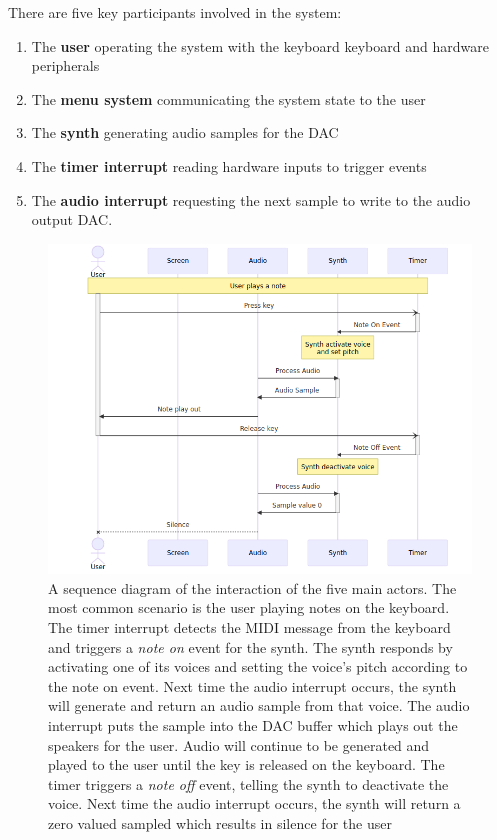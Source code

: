 \documentclass[acmlarge,screen]{acmart}
\begin{document}
	There are five key participants involved in the system:
	\begin{enumerate}
		\item The \textbf{user} operating the system with the keyboard keyboard and hardware peripherals
		\item The \textbf{menu system} communicating the system state to the user
		\item The \textbf{synth} generating audio samples for the DAC
		\item The \textbf{timer interrupt} reading hardware inputs to trigger events
		\item The \textbf{audio interrupt} requesting the next sample to write to the audio output DAC.
	\end{enumerate}


	\begin{figure}[H]
		\centering
		\includegraphics[width=.7\linewidth]{play_note_sequence}
		\caption{A sequence diagram of the interaction of the five main actors. The most common scenario is the user playing notes on the keyboard. The timer interrupt detects the MIDI message from the keyboard and triggers a \textit{note on} event for the synth. The synth responds by activating one of its voices and setting the voice's pitch according to the note on event. Next time the audio interrupt occurs, the synth will generate and return an audio sample from that voice. The audio interrupt puts the sample into the DAC buffer which plays out the speakers for the user. Audio will continue to be generated and played to the user until the key is released on the keyboard. The timer triggers a \textit{note off} event, telling the synth to deactivate the voice. Next time the audio interrupt occurs, the synth will return a zero valued sampled which results in silence for the user}
	\end{figure}
	
\end{document}
